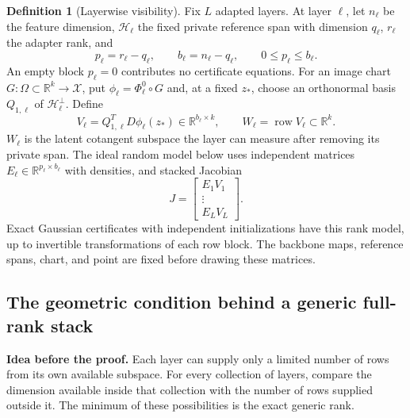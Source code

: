 \documentclass[11pt,a4paper]{article}
\theoremstyle{definition}
\theoremstyle{definition}
\newtheorem{definition}[theorem]{Definition}
\theoremstyle{remark}\newtheorem{remark}[theorem]{Remark}
\newcommand{\R}{\mathbb R}\newcommand{\Prob}{\mathbb P}\newcommand{\E}{\mathbb E}
\newcommand{\HH}{\mathcal H}\newcommand{\XX}{\mathcal X}\newcommand{\col}{\operatorname{col}}
\newcommand{\row}{\operatorname{row}}\newcommand{\rank}{\operatorname{rank}}
\newcommand{\proofidea}[1]{\par\textcolor{chartblue}{\textbf{Idea before the proof.}} #1\par}
\begin{document}
\begin{definition}[Layerwise visibility]
Fix $L$ adapted layers. At layer $\ell$, let $n_\ell$ be the feature dimension, $\HH_\ell$ the fixed private reference span with dimension $q_\ell$, $r_\ell$ the adapter rank, and
\[
p_\ell=r_\ell-q_\ell,\qquad b_\ell=n_\ell-q_\ell,
\qquad 0\le p_\ell\le b_\ell.
\]
An empty block $p_\ell=0$ contributes no certificate equations. For an image chart $G:\Omega\subset\R^k\to\XX$, put $\phi_\ell=\Phi_\ell^0\circ G$ and, at a fixed $z_*$, choose an orthonormal basis $Q_{1,\ell}$ of $\HH_\ell^\perp$. Define
\[
V_\ell=Q_{1,\ell}^TD\phi_\ell(z_*)\in\R^{b_\ell\times k},\qquad
W_\ell=\row V_\ell\subset\R^k.
\]
$W_\ell$ is the latent cotangent subspace the layer can measure after removing its private span. The ideal random model below uses independent matrices $E_\ell\in\R^{p_\ell\times b_\ell}$ with densities, and stacked Jacobian
\[
J=\begin{bmatrix}E_1V_1\\ \vdots\\ E_LV_L\end{bmatrix}.
\]
Exact Gaussian certificates with independent initializations have this rank model, up to invertible transformations of each row block. The backbone maps, reference spans, chart, and point are fixed before drawing these matrices.
\end{definition}

\subsection{The geometric condition behind a generic full-rank stack}

\proofidea{Each layer can supply only a limited number of rows from its own available subspace. For every collection of layers, compare the dimension available inside that collection with the number of rows supplied outside it. The minimum of these possibilities is the exact generic rank.}
\end{document}
